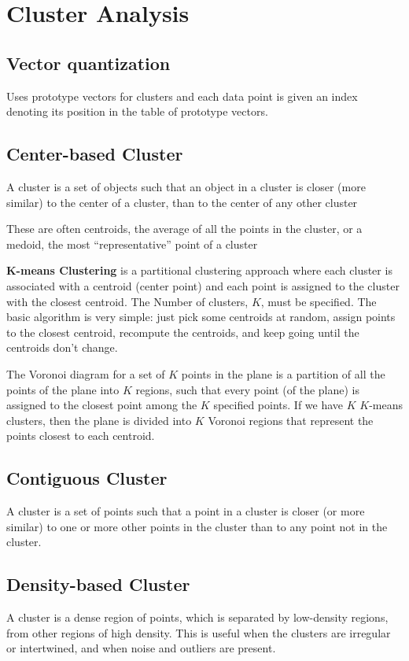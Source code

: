 \documentclass[12pt]{amsart}
\begin{document}
\section{Cluster Analysis}

\subsection{Vector quantization} Uses prototype vectors for clusters and each data point is given an index denoting its position in the table of prototype vectors.

\subsection{Center-based Cluster}
A cluster is a set of objects such that an object in a cluster is
closer (more similar) to the center of a cluster, than to the
center of any other cluster

These are often centroids, the average of all
the points in the cluster, or a medoid, the most ``representative''
point of a cluster 

\textbf{K-means Clustering} is a partitional clustering approach where each cluster is associated with a centroid (center point) and each point is assigned to the cluster with the closest
centroid.
The Number of clusters, $K$, must be specified. The basic algorithm is very simple: just pick some centroids at random, assign points to the closest centroid, recompute the centroids, and keep going until the centroids don't change.

The Voronoi diagram for a set of $K$ points in the plane is a partition of all the points of the plane into $K$ regions, such that every point (of the plane) is assigned to the closest point among the $K$ specified points. If we have $K$ $K$-means clusters, then the plane is divided into $K$ Voronoi regions that represent the points closest to each centroid.

\subsection{Contiguous Cluster}
A cluster is a set of points such that a point in a cluster is
closer (or more similar) to one or more other points in the
cluster than to any point not in the cluster.

\subsection{Density-based Cluster}
A cluster is a dense region of points, which is separated by
low-density regions, from other regions of high density. This is useful when the clusters are irregular or intertwined, and when
noise and outliers are present. 
\end{document}
